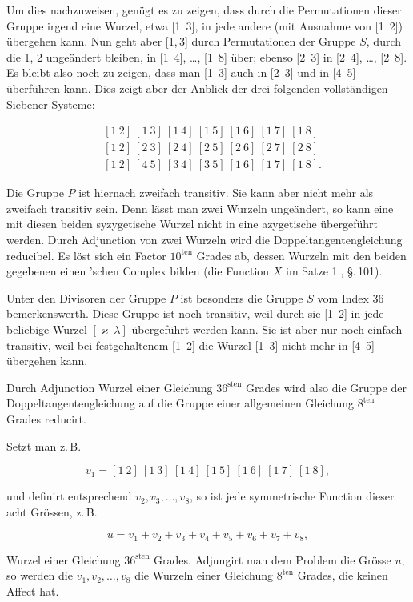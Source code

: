 
Um dies nachzuweisen, genügt es zu zeigen, dass durch die
Permutationen dieser Gruppe irgend eine Wurzel, etwa [1\ 3], in
jede andere (mit Ausnahme von [1\ 2]) übergehen kann. Nun
geht aber [1,\,3] %
durch Permutationen der Gruppe $S$, durch die
1, 2 ungeändert bleiben, in [1\ 4], \dots, [1\ 8] über; ebenso [2\ 3] in
[2\ 4], \dots, [2\ 8]. Es bleibt also noch zu zeigen, dass man [1\ 3]
auch in [2\ 3] und in [4\ 5] überführen kann. Dies zeigt aber
der Anblick der drei folgenden vollständigen Siebener-Systeme:

\[
\begin{aligned}
&[1\ 2]\ [1\ 3]\ [1\ 4]\ [1\ 5]\ [1\ 6]\ [1\ 7]\ [1\ 8]\\
&[1\ 2]\ [2\ 3]\ [2\ 4]\ [2\ 5]\ [2\ 6]\ [2\ 7]\ [2\ 8]\\
&[1\ 2]\ [4\ 5]\ [3\ 4]\ [3\ 5]\ [1\ 6]\ [1\ 7]\ [1\ 8].
\end{aligned}
\]

Die Gruppe $P$ ist hiernach zweifach transitiv. Sie kann
aber nicht mehr als zweifach transitiv sein. Denn lässt man
zwei Wurzeln ungeändert, so kann eine mit diesen beiden syzygetische
Wurzel nicht in eine azygetische übergeführt werden.
Durch Adjunction von zwei Wurzeln wird die Doppeltangentengleichung
reducibel. Es löst sich ein Factor $10^{\text{ten}}$ Grades ab,
dessen Wurzeln mit den beiden gegebenen einen 'schen
Complex bilden (die Function $X$ im Satze 1., \S.\,101).

Unter den Divisoren der Gruppe $P$ ist besonders die
Gruppe $S$ vom Index 36 bemerkenswerth. Diese Gruppe ist noch
transitiv, weil durch sie [1\ 2] in jede beliebige Wurzel $[\varkappa\ \lambda]$
übergeführt werden kann. Sie ist aber nur noch einfach transitiv,
weil bei festgehaltenem [1\ 2] die Wurzel [1\ 3] nicht mehr
in [4\ 5] übergehen kann.

Durch Adjunction  Wurzel einer Gleichung $36^{\text{sten}}$ Grades
wird also die Gruppe der Doppeltangentengleichung auf die
Gruppe einer allgemeinen Gleichung $8^{\text{ten}}$ Grades reducirt.

Setzt man z.\,B.

\[
v_1 = [1\ 2]\ [1\ 3]\ [1\ 4]\ [1\ 5]\ [1\ 6]\ [1\ 7]\ [1\ 8],
\]

und definirt entsprechend $v_2, v_3, \dots, v_8$, so ist jede symmetrische
Function dieser acht Grössen, z.\,B.

\[
u = v_1 + v_2 + v_3 + v_4 + v_5 + v_6 + v_7 + v_8,
\]

Wurzel einer Gleichung $36^{\text{sten}}$ Grades. Adjungirt man dem
Problem die Grösse $u$, so werden die $v_1, v_2, \dots, v_8$ die Wurzeln
einer Gleichung $8^{\text{ten}}$ Grades, die keinen Affect hat.
